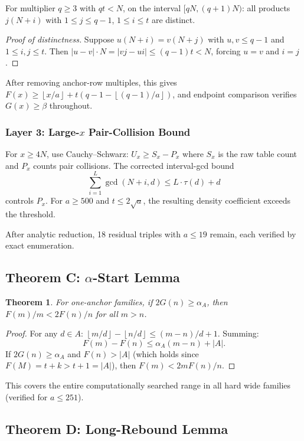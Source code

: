 \documentclass[11pt,a4paper]{article}
\newtheorem{theorem}{Theorem}[section]
\theoremstyle{definition}
\newcommand{\floor}[1]{\left\lfloor #1 \right\rfloor}
\begin{document}
For multiplier $q \geq 3$ with $qt < N$, on the interval 
$[qN, (q+1)N)$: all products $j(N+i)$ with $1 \leq j \leq q-1$, 
$1 \leq i \leq t$ are distinct.

\begin{proof}[Proof of distinctness]
Suppose $u(N+i) = v(N+j)$ with $u,v \leq q-1$ and $1 \leq i,j \leq t$. 
Then $|u-v| \cdot N = |vj - ui| \leq (q-1)t < N$, forcing $u = v$ and 
$i = j$.
\end{proof}

After removing anchor-row multiples, this gives 
$F(x) \geq \floor{x/a} + t(q-1 - \floor{(q-1)/a})$, and endpoint 
comparison verifies $G(x) \geq \beta$ throughout.

\subsubsection{Layer 3: Large-$x$ Pair-Collision Bound}

For $x \geq 4N$, use Cauchy--Schwarz: $U_x \geq S_x - P_x$ where 
$S_x$ is the raw table count and $P_x$ counts pair collisions. The 
corrected interval-gcd bound
\[
\sum_{i=1}^{L} \gcd(N+i, d) \leq L \cdot \tau(d) + d
\]
controls $P_x$. For $a \geq 500$ and $t \leq 2\sqrt{a}$, the resulting 
density coefficient exceeds the threshold.

After analytic reduction, 18 residual triples with $a \leq 19$ remain, 
each verified by exact enumeration.

\subsection{Theorem C: $\alpha$-Start Lemma}

\begin{theorem}\label{thm:alpha-start}
For one-anchor families, if $2G(n) \geq \alpha_A$, then 
$F(m)/m < 2F(n)/n$ for all $m > n$.
\end{theorem}

\begin{proof}
For any $d \in A$: 
$\floor{m/d} - \floor{n/d} \leq (m-n)/d + 1$. Summing:
\[
F(m) - F(n) \leq \alpha_A(m-n) + |A|.
\]
If $2G(n) \geq \alpha_A$ and $F(n) > |A|$ (which holds since 
$F(M) = t + k > t + 1 = |A|$), then $F(m) < 2mF(n)/n$.
\end{proof}

This covers the entire computationally searched range in all hard wide 
families (verified for $a \leq 251$).

\subsection{Theorem D: Long-Rebound Lemma}
\end{document}
